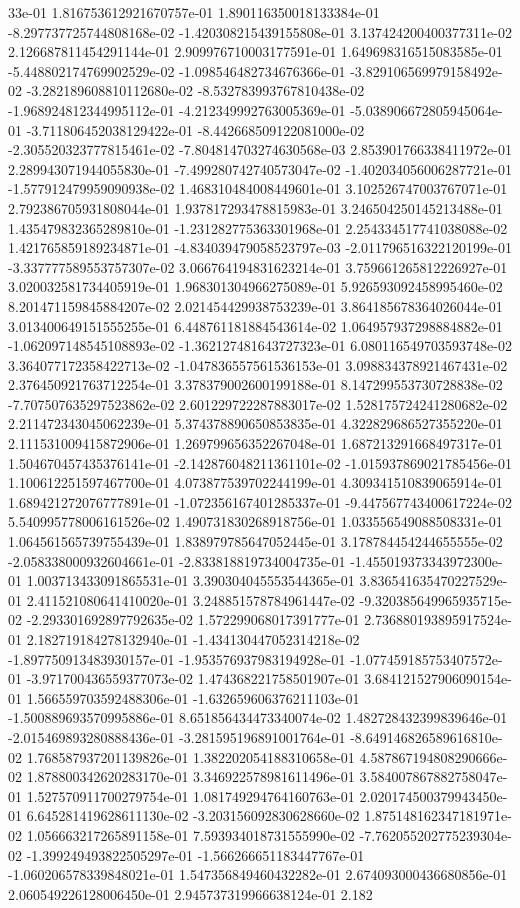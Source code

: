 33e-01	1.816753612921670757e-01	1.890116350018133384e-01	-8.297737725744808168e-02	-1.420308215439155808e-01	3.137424200400377311e-02	2.126687811454291144e-01	2.909976710003177591e-01	1.649698316515083585e-01	-5.448802174769902529e-02	-1.098546482734676366e-01	-3.829106569979158492e-02	-3.282189608810112680e-02	-8.532783993767810438e-02	-1.968924812344995112e-01	-4.212349992763005369e-01	-5.038906672805945064e-01	-3.711806452038129422e-01	-8.442668509122081000e-02	-2.305520323777815461e-02	-7.804814703274630568e-03	2.853901766338411972e-01	2.289943071944055830e-01	-7.499280742740573047e-02	-1.402034056006287721e-01	-1.577912479959090938e-02	1.468310484008449601e-01	3.102526747003767071e-01	2.792386705931808044e-01	1.937817293478815983e-01	3.246504250145213488e-01	1.435479832365289810e-01	-1.231282775363301968e-01	2.254334517741038088e-02	1.421765859189234871e-01	-4.834039479058523797e-03	-2.011796516322120199e-01	-3.337777589553757307e-02	3.066764194831623214e-01	3.759661265812226927e-01	3.020032581734405919e-01	1.968301304966275089e-01	5.926593092458995460e-02	8.201471159845884207e-02	2.021454429938753239e-01	3.864185678364026044e-01	3.013400649151555255e-01	6.448761181884543614e-02	1.064957937298884882e-01	-1.062097148545108893e-02	-1.362127481643727323e-01	6.080116549703593748e-02	3.364077172358422713e-02	-1.047836557561536153e-01	3.098834378921467431e-02	2.376450921763712254e-01	3.378379002600199188e-01	8.147299553730728838e-02	-7.707507635297523862e-02	2.601229722287883017e-02	1.528175724241280682e-02	2.211472343045062239e-01	5.374378890650853835e-01	4.322829686527355220e-01	2.111531009415872906e-01	1.269799656352267048e-01	1.687213291668497317e-01	1.504670457435376141e-01	-2.142876048211361101e-02	-1.015937869021785456e-01	1.100612251597467700e-01	4.073877539702244199e-01	4.309341510839065914e-01	1.689421272076777891e-01	-1.072356167401285337e-01	-9.447567743400617224e-02	5.540995778006161526e-02	1.490731830268918756e-01	1.033556549088508331e-01	1.064561565739755439e-01	1.838979785647052445e-01	3.178784454244655555e-02	-2.058338000932604661e-01	-2.833818819734004735e-01	-1.455019373343972300e-01	1.003713433091865531e-01	3.390304045553544365e-01	3.836541635470227529e-01	2.411521080641410020e-01	3.248851578784961447e-02	-9.320385649965935715e-02	-2.293301692897792635e-02	1.572299068017391777e-01	2.736880193895917524e-01	2.182719184278132940e-01	-1.434130447052314218e-02	-1.897750913483930157e-01	-1.953576937983194928e-01	-1.077459185753407572e-01	-3.971700436559377073e-02	1.474368221758501907e-01	3.684121527906090154e-01	1.566559703592488306e-01	-1.632659606376211103e-01	-1.500889693570995886e-01	8.651856434473340074e-02	1.482728432399839646e-01	-2.015469893280888436e-01	-3.281595196891001764e-01	-8.649146826589616810e-02	1.768587937201139826e-01	1.382202054188310658e-01	4.587867194808290666e-02	1.878800342620283170e-01	3.346922578981611496e-01	3.584007867882758047e-01	1.527570911700279754e-01	1.081749294764160763e-01	2.020174500379943450e-01	6.645281419628611130e-02	-3.203156092830628660e-02	1.875148162347181971e-02	1.056663217265891158e-01	7.593934018731555990e-02	-7.762055202775239304e-02	-1.399249493822505297e-01	-1.566266651183447767e-01	-1.060206578339848021e-01	1.547356849460432282e-01	2.674093000436680856e-01	2.060549226128006450e-01	2.945737319966638124e-01	2.182